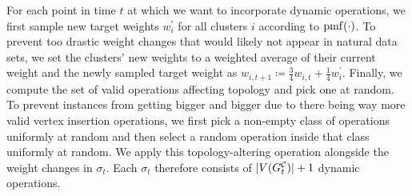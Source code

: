 For each point in time $t$ at which we want to incorporate dynamic operations, we first sample new target weights $w_i^\prime$ for all clusters $i$ according to $\operatorname{pmf}(\cdot)$.
To prevent too drastic weight changes that would likely not appear in natural data sets, we set the clusters' new weights to a weighted average of their current weight and the newly sampled target weight as $w_{i,t+1} \coloneqq \frac34 w_{i,t} + \frac14 w_i^\prime$.
Finally, we compute the set of valid operations affecting topology and pick one at random.
To prevent instances from getting bigger and bigger due to there being way more valid vertex insertion operations, we first pick a non-empty class of operations uniformly at random and then select a random operation inside that class uniformly at random.
We apply this topology-altering operation alongside the weight changes in $\sigma_t$.
Each $\sigma_t$ therefore consists of $\lvert V(G^\mathcal{C}_{t}) \rvert + 1$ dynamic operations.
